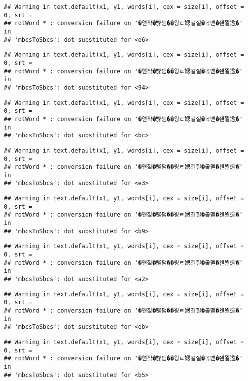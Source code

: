 \documentclass[]{article}
\begin{document}
\begin{verbatim}
## Warning in text.default(x1, y1, words[i], cex = size[i], offset = 0, srt =
## rotWord * : conversion failure on '�얜챸�뺞꽴��욍ㅌ媤길낄�곸몓�쇈묄逾�' in
## 'mbcsToSbcs': dot substituted for <e6>
\end{verbatim}

\begin{verbatim}
## Warning in text.default(x1, y1, words[i], cex = size[i], offset = 0, srt =
## rotWord * : conversion failure on '�얜챸�뺞꽴��욍ㅌ媤길낄�곸몓�쇈묄逾�' in
## 'mbcsToSbcs': dot substituted for <94>
\end{verbatim}

\begin{verbatim}
## Warning in text.default(x1, y1, words[i], cex = size[i], offset = 0, srt =
## rotWord * : conversion failure on '�얜챸�뺞꽴��욍ㅌ媤길낄�곸몓�쇈묄逾�' in
## 'mbcsToSbcs': dot substituted for <bc>
\end{verbatim}

\begin{verbatim}
## Warning in text.default(x1, y1, words[i], cex = size[i], offset = 0, srt =
## rotWord * : conversion failure on '�얜챸�뺞꽴��욍ㅌ媤길낄�곸몓�쇈묄逾�' in
## 'mbcsToSbcs': dot substituted for <e3>
\end{verbatim}

\begin{verbatim}
## Warning in text.default(x1, y1, words[i], cex = size[i], offset = 0, srt =
## rotWord * : conversion failure on '�얜챸�뺞꽴��욍ㅌ媤길낄�곸몓�쇈묄逾�' in
## 'mbcsToSbcs': dot substituted for <b9>
\end{verbatim}

\begin{verbatim}
## Warning in text.default(x1, y1, words[i], cex = size[i], offset = 0, srt =
## rotWord * : conversion failure on '�얜챸�뺞꽴��욍ㅌ媤길낄�곸몓�쇈묄逾�' in
## 'mbcsToSbcs': dot substituted for <a2>
\end{verbatim}

\begin{verbatim}
## Warning in text.default(x1, y1, words[i], cex = size[i], offset = 0, srt =
## rotWord * : conversion failure on '�얜챸�뺞꽴��욍ㅌ媤길낄�곸몓�쇈묄逾�' in
## 'mbcsToSbcs': dot substituted for <eb>
\end{verbatim}

\begin{verbatim}
## Warning in text.default(x1, y1, words[i], cex = size[i], offset = 0, srt =
## rotWord * : conversion failure on '�얜챸�뺞꽴��욍ㅌ媤길낄�곸몓�쇈묄逾�' in
## 'mbcsToSbcs': dot substituted for <b5>
\end{verbatim}
\end{document}
